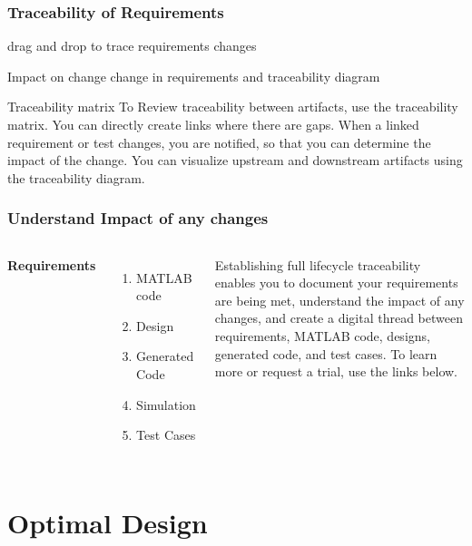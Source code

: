\begin{frame}
\frametitle{Traceability of  Requirements }

\begin{block}{drag and drop }
to trace requirements changes 
\end{block}

\begin{block}{Impact on change}
change in requirements and traceability diagram
\end{block}
\end{frame}

\begin{frame}
\begin{block}{Traceability matrix}
To Review traceability between artifacts, use the traceability matrix. You can directly create links where there are gaps. When a linked requirement or test changes, you are notified, so that you can determine the impact of the change. You can visualize upstream and downstream artifacts using the traceability diagram.
\end{block}
\end{frame}

\begin{frame}
\frametitle{Understand Impact of any changes }
\begin{columns}[c] 
\textbf{Requirements}
\begin{enumerate}
\item MATLAB code
\item Design
\item Generated Code
\item Simulation
\item Test Cases
\end{enumerate}

Establishing full lifecycle traceability enables you to document your requirements are being met, understand the impact of any changes, and create a digital thread between requirements, MATLAB code, designs, generated code, and test cases. To learn more or request a trial, use the links below.
\end{columns}
\end{frame}

\section{ Optimal Design}

